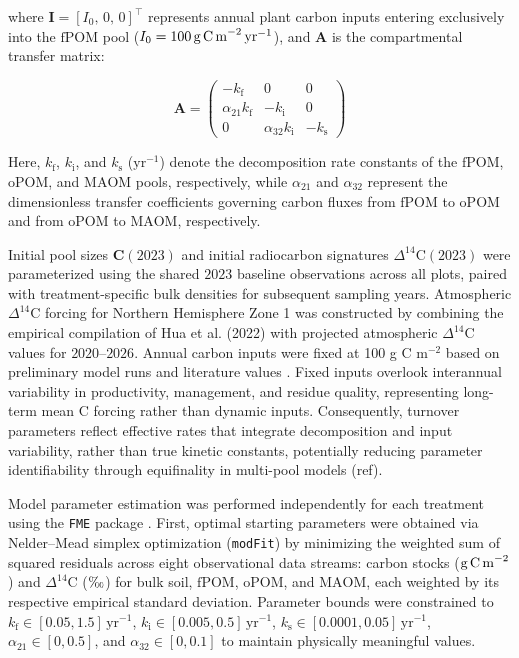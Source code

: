 \documentclass[preprint,12pt]{elsarticle}
\begin{document}
where $\mathbf{I} = [I_0,\, 0,\, 0]^{\top}$ represents annual plant carbon inputs entering exclusively into the $\text{fPOM}$ pool ($I_0 = 100\,\text{g\,C\,m}^{-2}\,\text{yr}^{-1}$), and $\mathbf{A}$ is the compartmental transfer matrix:

\begin{equation}
\mathbf{A} = \begin{pmatrix}
-k_{\text{f}} & 0 & 0 \\
\alpha_{21} k_{\text{f}} & -k_{\text{i}} & 0 \\
0 & \alpha_{32} k_{\text{i}} & -k_{\text{s}}
\end{pmatrix}
\end{equation}

Here, $k_{\text{f}}$, $k_{\text{i}}$, and $k_{\text{s}}$ ($\text{yr}^{-1}$) denote the decomposition rate constants of the $\text{fPOM}$, $\text{oPOM}$, and $\text{MAOM}$ pools, respectively, while $\alpha_{21}$ and $\alpha_{32}$ represent the dimensionless transfer coefficients governing carbon fluxes from $\text{fPOM}$ to $\text{oPOM}$ and from $\text{oPOM}$ to $\text{MAOM}$, respectively.

Initial pool sizes $\mathbf{C}(2023)$ and initial radiocarbon signatures $\Delta^{14}\text{C}(2023)$ were parameterized using the shared $2023$ baseline observations across all plots, paired with treatment-specific bulk densities for subsequent sampling years. Atmospheric $\Delta^{14}\text{C}$ forcing for Northern Hemisphere Zone 1 was constructed by combining the empirical compilation of Hua et al. (2022) \citep{Hua2022} with projected atmospheric $\Delta^{14}\text{C}$ values for $2020\text{--}2026$. Annual carbon inputs were fixed at 100 g C m$^{-2}$ based on preliminary model runs and literature values \citep{Ven2020}. Fixed inputs overlook interannual variability in productivity, management, and residue quality, representing long-term mean C forcing rather than dynamic inputs. Consequently, turnover parameters reflect effective rates that integrate decomposition and input variability, rather than true kinetic constants, potentially reducing parameter identifiability through equifinality in multi-pool models (ref).

Model parameter estimation was performed independently for each treatment using the \texttt{FME} package \citep{Soetaert2010}. First, optimal starting parameters were obtained via Nelder--Mead simplex optimization (\texttt{modFit}) by minimizing the weighted sum of squared residuals across eight observational data streams: carbon stocks ($\text{g\,C\,m}^{-2}$) and $\Delta^{14}\text{C}$ ($\text{\textperthousand}$) for bulk soil, $\text{fPOM}$, $\text{oPOM}$, and $\text{MAOM}$, each weighted by its respective empirical standard deviation. Parameter bounds were constrained to $k_{\text{f}} \in [0.05, 1.5]\,\text{yr}^{-1}$, $k_{\text{i}} \in [0.005, 0.5]\,\text{yr}^{-1}$, $k_{\text{s}} \in [0.0001, 0.05]\,\text{yr}^{-1}$, $\alpha_{21} \in [0, 0.5]$, and $\alpha_{32} \in [0, 0.1]$ to maintain physically meaningful values.
\end{document}
